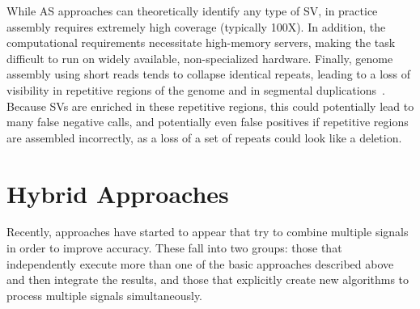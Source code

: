 
While AS approaches can theoretically identify any type of SV, in practice assembly requires extremely high coverage (typically 100X). In addition, the computational requirements necessitate high-memory servers, making the task difficult to run on widely available, non-specialized hardware. Finally, genome assembly using short reads tends to collapse identical repeats, leading to a loss of visibility in repetitive regions of the genome and in segmental duplications~\cite{Alkan:2011hs}. Because SVs are enriched in these repetitive regions, this could potentially lead to many false negative calls, and potentially even false positives if repetitive regions are assembled incorrectly, as a loss of a set of repeats could look like a deletion.

\section{Hybrid Approaches}

Recently, approaches have started to appear that try to combine multiple signals in order to improve accuracy. These fall into two groups: those that independently execute more than one of the basic approaches described above and then integrate the results, and those that explicitly create new algorithms to process multiple signals simultaneously.

